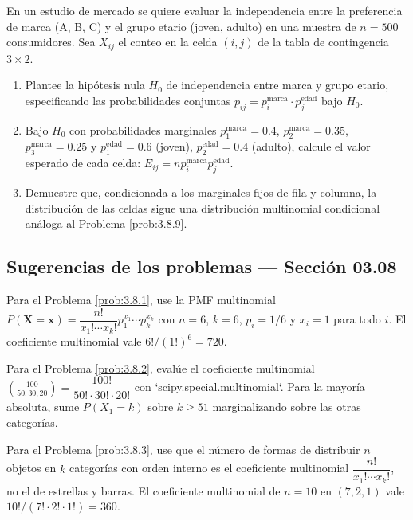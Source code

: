 \begin{problema}
	\label{prob:3.8.10}
	En un estudio de mercado se quiere evaluar la independencia entre la preferencia de marca (A, B, C) y el grupo etario (joven, adulto) en una muestra de $n = 500$ consumidores. Sea $X_{ij}$ el conteo en la celda $(i, j)$ de la tabla de contingencia $3 \times 2$.
	\begin{enumerate}
		\item Plantee la hipótesis nula $H_{0}$ de independencia entre marca y grupo etario, especificando las probabilidades conjuntas $p_{ij} = p_{i}^{\text{marca}} \cdot p_{j}^{\text{edad}}$ bajo $H_{0}$.
		\item Bajo $H_{0}$ con probabilidades marginales $p_{1}^{\text{marca}} = 0.4$, $p_{2}^{\text{marca}} = 0.35$, $p_{3}^{\text{marca}} = 0.25$ y $p_{1}^{\text{edad}} = 0.6$ (joven), $p_{2}^{\text{edad}} = 0.4$ (adulto), calcule el valor esperado de cada celda: $E_{ij} = n p_{i}^{\text{marca}} p_{j}^{\text{edad}}$.
		\item Demuestre que, condicionada a los marginales fijos de fila y columna, la distribución de las celdas sigue una distribución multinomial condicional análoga al Problema \ref{prob:3.8.9}.
	\end{enumerate}
\end{problema}

\subsection*{Sugerencias de los problemas --- Sección 03.08}

\begin{sugerencia}
	\label{sug:3.8.1}
	Para el Problema \ref{prob:3.8.1}, use la PMF multinomial $P(\bm{X} = \bm{x}) = \dfrac{n!}{x_{1}!\cdots x_{k}!} p_{1}^{x_{1}} \cdots p_{k}^{x_{k}}$ con $n=6$, $k=6$, $p_{i} = 1/6$ y $x_{i} = 1$ para todo $i$. El coeficiente multinomial vale $6!/(1!)^{6} = 720$.
\end{sugerencia}

\begin{sugerencia}
	\label{sug:3.8.2}
	Para el Problema \ref{prob:3.8.2}, evalúe el coeficiente multinomial $\binom{100}{50, 30, 20} = \dfrac{100!}{50! \cdot 30! \cdot 20!}$ con `scipy.special.multinomial`. Para la mayoría absoluta, sume $P(X_{1} = k)$ sobre $k \ge 51$ marginalizando sobre las otras categorías.
\end{sugerencia}

\begin{sugerencia}
	\label{sug:3.8.3}
	Para el Problema \ref{prob:3.8.3}, use que el número de formas de distribuir $n$ objetos en $k$ categorías con orden interno es el coeficiente multinomial $\dfrac{n!}{x_{1}! \cdots x_{k}!}$, no el de estrellas y barras. El coeficiente multinomial de $n=10$ en $(7, 2, 1)$ vale $10!/(7! \cdot 2! \cdot 1!) = 360$.
\end{sugerencia}

